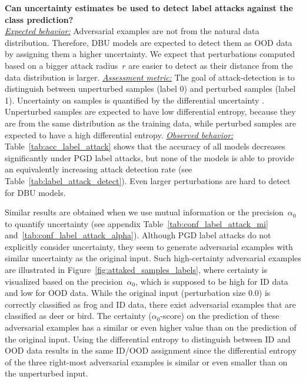 \textbf{Can uncertainty estimates be used to detect label attacks against the class prediction?}\\
%
\underline{\emph{Expected behavior:}} Adversarial examples are not from the natural data distribution. Therefore, DBU models are expected to detect them as OOD data by assigning them a higher uncertainty. We expect that perturbations computed based on a bigger attack radius~$r$ are easier to detect as their distance from the data distribution is larger. 
\underline{\emph{Assessment metric:}} The goal of attack-detection is to distinguish between unperturbed samples (label 0) and perturbed samples (label 1). Uncertainty on samples is quantified by the differential uncertainty \citep{malini2018}. Unperturbed samples are expected to have low differential entropy, because they are from the same distribution as the training data, while perturbed samples are expected to have a high differential entropy. 
\underline{\emph{Observed behavior:}} Table~\ref{tab:acc_label_attack} shows that the accuracy of all models decreases significantly under PGD label attacks, but none of the models is able to provide an equivalently increasing attack detection rate (see Table~\ref{tab:label_attack_detect}). Even larger perturbations are hard to detect for DBU models. 

Similar results are obtained when we use mutual information or the precision~$\alpha_0$ to quantify uncertainty (see appendix Table~\ref{tab:conf_label_attack_mi} and~\ref{tab:conf_label_attack_alpha}).
Although PGD label attacks do not explicitly consider uncertainty, they seem to generate adversarial examples with similar uncertainty as the original input. 
Such high-certainty adversarial examples are illustrated in Figure~\ref{fig:attaked_samples_labels}, where certainty is visualized based on the precision~$\alpha_0$, which is supposed to be high for ID data and low for OOD data. While the original input (perturbation size $0.0$) is correctly classified as frog and ID data, there exist adversarial examples that are classified as deer or bird. The certainty ($\alpha_0$-score) on the prediction of these adversarial examples has a similar or even higher value than on the prediction of the original input. Using the differential entropy to distinguish between ID and OOD data results in the same ID/OOD assignment since the differential entropy of the three right-most adversarial examples is similar or even smaller than on the unperturbed input. 







